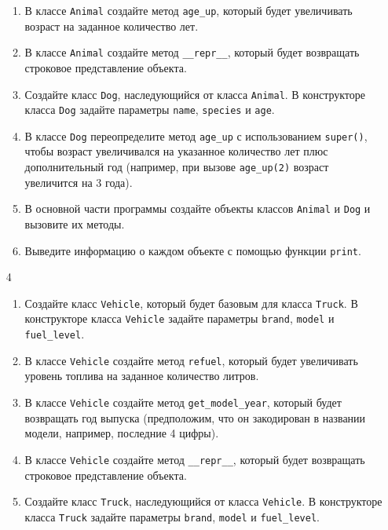 \begin{enumerate}
\begin{enumerate}
    \item В классе \texttt{Animal} создайте метод \texttt{age\_up}, который будет увеличивать возраст на заданное количество лет.
    
    \item В классе \texttt{Animal} создайте метод \texttt{\_\_repr\_\_}, который будет возвращать строковое представление объекта.
    
    \item Создайте класс \texttt{Dog}, наследующийся от класса \texttt{Animal}. В конструкторе класса \texttt{Dog} задайте параметры \texttt{name}, \texttt{species} и \texttt{age}.
    
    \item В классе \texttt{Dog} переопределите метод \texttt{age\_up} с использованием \texttt{super()}, чтобы возраст увеличивался на указанное количество лет плюс дополнительный год (например, при вызове \texttt{age\_up(2)} возраст увеличится на 3 года).
    
    \item В основной части программы создайте объекты классов \texttt{Animal} и \texttt{Dog} и вызовите их методы.
    
    \item Выведите информацию о каждом объекте с помощью функции \texttt{print}.
\end{enumerate}

\item[4] 
\begin{enumerate}
    \item Создайте класс \texttt{Vehicle}, который будет базовым для класса \texttt{Truck}. В конструкторе класса \texttt{Vehicle} задайте параметры \texttt{brand}, \texttt{model} и \texttt{fuel\_level}.
    
    \item В классе \texttt{Vehicle} создайте метод \texttt{refuel}, который будет увеличивать уровень топлива на заданное количество литров.
    
    \item В классе \texttt{Vehicle} создайте метод \texttt{get\_model\_year}, который будет возвращать год выпуска (предположим, что он закодирован в названии модели, например, последние 4 цифры).
    
    \item В классе \texttt{Vehicle} создайте метод \texttt{\_\_repr\_\_}, который будет возвращать строковое представление объекта.
    
    \item Создайте класс \texttt{Truck}, наследующийся от класса \texttt{Vehicle}. В конструкторе класса \texttt{Truck} задайте параметры \texttt{brand}, \texttt{model} и \texttt{fuel\_level}.
    

\end{enumerate}
\end{enumerate}
